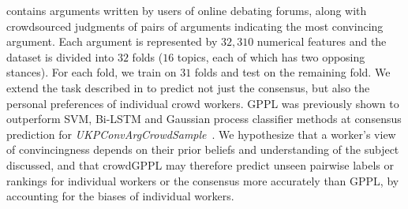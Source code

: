 contains arguments written by users
of online debating forums,
along with crowdsourced judgments of pairs of arguments
 indicating the most convincing argument.
Each argument is represented by $32,310$ numerical features and the
dataset is divided into $32$ folds ($16$ topics, each of which has two opposing stances). For each fold, we train on $31$ folds and test on the remaining fold.
We extend
the task described in \citet{simpson2018finding} to predict not just the consensus,
but also the personal preferences of individual crowd workers.
GPPL was previously shown to outperform SVM, Bi-LSTM and 
Gaussian process classifier methods at consensus prediction for \emph{UKPConvArgCrowdSample}~\citep{simpson2018finding}. 
We hypothesize that a worker's view of convincingness 
depends on their prior beliefs and understanding of the subject 
discussed, and that crowdGPPL may therefore
predict unseen 
pairwise labels or rankings for individual workers or the consensus more accurately than GPPL,
by accounting 
for the biases of individual workers.

